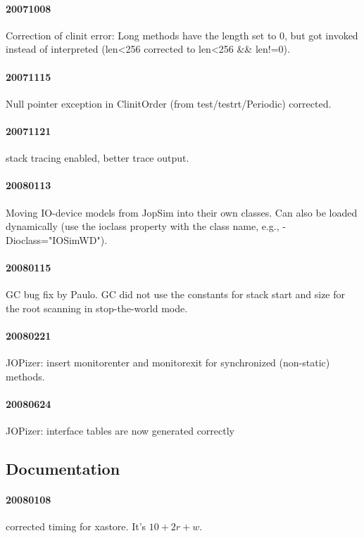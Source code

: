 \documentclass[a4paper,12pt]{scrartcl}
\newcommand{\code}[1]{{\textsf{#1}}}
\begin{document}
\paragraph{20071008} Correction of clinit error: Long methods have
the length set to 0, but got invoked instead of interpreted (len<256
corrected to len<256 \&\& len!=0).

\paragraph{20071115} Null pointer exception in ClinitOrder
(from test/testrt/Periodic) corrected.

\paragraph{20071121} stack tracing enabled, better trace output.

\paragraph{20080113} Moving IO-device models from JopSim into their
own classes. Can also be loaded dynamically (use the \code{ioclass}
property with the class name, e.g., \code{-Dioclass="IOSimWD"}).

\paragraph{20080115} GC bug fix by Paulo. GC did not use the
constants for stack start and size for the root scanning in
stop-the-world mode.

\paragraph{20080221} JOPizer: insert monitorenter and monitorexit for
synchronized (non-static) methods.

\paragraph{20080624} JOPizer: interface tables are now generated correctly

\subsection{Documentation}

\paragraph{20080108} corrected timing for \code{xastore}. It's $10 +
2r + w$.
\end{document}
